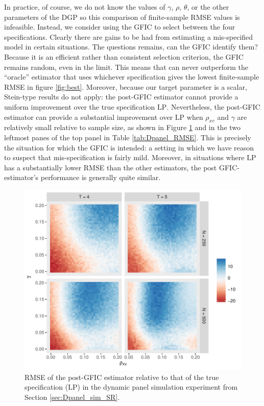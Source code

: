 In practice, of course, we do not know the values of $\gamma$, $\rho$, $\theta$, or the other parameters of the DGP so this comparison of finite-sample RMSE values is infeasible.
Instead, we consider using the GFIC to select between the four specifications.
Clearly there are gains to be had from estimating a mis-specified model in certain situations.
The questions remains, can the GFIC identify them?
Because it is an efficient rather than consistent selection criterion, the GFIC remains random, even in the limit.
This means that can never outperform the ``oracle'' estimator that uses whichever specification gives the lowest finite-sample RMSE in figure \ref{fig:best}.
Moreover, because our target parameter is a scalar, Stein-type results do not apply: the post-GFIC estimator cannot provide a uniform improvement over the true specification $\text{LP}$.
Nevertheless, the post-GFIC estimator can provide a substantial improvement over $\text{LP}$ when $\rho_{xv}$ and $\gamma$ are relatively small relative to sample size, as shown in Figure \ref{fig:GFIC_rel_LP} and in the two leftmost panes of the top panel in Table \ref{tab:Dpanel_RMSE}.
This is precisely the situation for which the GFIC is intended: a setting in which we have reason to suspect that mis-specification is fairly mild.
Moreover, in situations where $\text{LP}$ has a substantially lower RMSE than the other estimators, the post GFIC-estimator's performance is generally quite similar.

\begin{figure}
\centering
\includegraphics[scale = 0.8]{./simulations/DynamicPanel/results/Dpanel_GFIC_RMSE_rel_LP}
\caption{RMSE of the post-GFIC estimator relative to that of the true specification ($\text{LP}$) in the dynamic panel simulation experiment from Section \ref{sec:Dpanel_sim_SR}.}
\label{fig:GFIC_rel_LP}
\end{figure}

